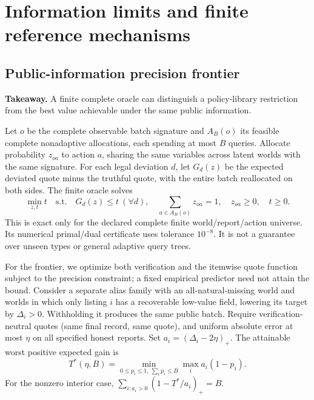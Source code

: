 \documentclass[11pt]{article}
\begin{document}
\section{Information limits and finite reference mechanisms}\label{sec:information}
\subsection{Public-information precision frontier}
\noindent\textbf{Takeaway.} A finite complete oracle can distinguish a policy-library
restriction from the best value achievable under the same public information.

Let $o$ be the complete observable batch signature and $A_B(o)$ its feasible
complete nonadaptive allocations, each spending at most $B$ queries. Allocate
probability $z_{oa}$ to action $a$, sharing the same variables across latent
worlds with the same signature. For each legal deviation $d$, let $G_d(z)$ be
the expected deviated quote minus the truthful quote, with the entire batch
reallocated on both sides. The finite oracle solves
\[
 \min_{z,t} t\quad\text{s.t.}\quad G_d(z)\le t\ (\forall d),\quad
 \sum_{a\in A_B(o)}z_{oa}=1,\quad z_{oa}\ge0,\quad t\ge0.
\]
This is exact only for the declared complete finite world/report/action universe.
Its numerical primal/dual certificate uses tolerance $10^{-8}$. It is not a
guarantee over unseen types or general adaptive query trees.

For the frontier, we optimize both verification and the itemwise quote function subject to the precision constraint; a fixed empirical predictor need not attain the bound. Consider a separate alias family with an all-natural-missing world and worlds
in which only listing $i$ has a recoverable low-value field, lowering its target
by $\Delta_i>0$. Withholding it produces the same public batch. Require
verification-neutral quotes (same final record, same quote), and uniform
absolute error at most $\eta$ on all specified honest reports. Set
$a_i=(\Delta_i-2\eta)_+$. The attainable worst positive expected gain is
\begin{equation}
T^*(\eta,B)=\min_{0\le p_i\le1,\ \sum_i p_i\le B}\max_i a_i(1-p_i).
\label{eq:frontier}
\end{equation}
For the nonzero interior case, $\sum_{i:a_i>0}(1-T^*/a_i)_+=B$.
\end{document}
